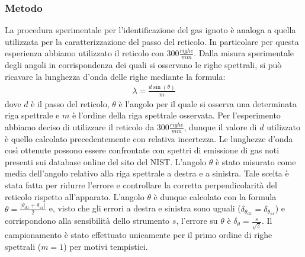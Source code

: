 \documentclass[a4paper]{article}
\begin{document}
\subsubsection{Metodo}
La procedura sperimentale per l'identificazione del gas ignoto è analoga a quella utilizzata per la caratterizzazione del passo del reticolo. In particolare per questa esperienza abbiamo utilizzato il reticolo con $300 \frac{righe}{mm}$. Dalla misura sperimentale degli angoli in corrispondenza dei quali si osservano le righe spettrali, si può ricavare la lunghezza d'onda delle righe mediante la formula:
\begin{align}
    \lambda=\frac{d\sin(\theta)}{m}
\label{eq:lambda_gas_ignoto_reticolo}
\end{align}
dove $d$ è il passo del reticolo, $\theta$ è l'angolo per il quale si osserva una determinata riga spettrale e $m$ è l'ordine della riga spettrale osservata. Per l'esperimento abbiamo deciso di utilizzare il reticolo da $300\frac{righe}{mm}$, dunque il valore di $d$ utilizzato è quello calcolato precedentemente con relativa incertezza.
Le lunghezze d'onda così ottenute possono essere confrontate con spettri di emissione di gas noti presenti sui database online del sito del NIST.
L'angolo $\theta$ è stato misurato come media dell'angolo relativo alla riga spettrale a destra e a sinistra. Tale scelta è stata fatta per ridurre l'errore e controllare la corretta perpendicolarità del reticolo rispetto all'apparato. L'angolo $\theta$ è dunque calcolato con la formula $\theta=\frac{|\theta_{dx}+\theta_{sx}|}{2}$ e, visto che gli errori a destra e sinistra sono uguali ($\delta_{\theta_{dx}}=\delta_{\theta_{sx}}$) e corrispondono alla sensibilità dello strumento $s$, l'errore su $\theta$ è $\delta_\theta=\frac{s}{\sqrt{2}}$. Il campionamento è stato effettuato unicamente per il primo ordine di righe spettrali ($m=1$) per motivi tempistici.
\end{document}
